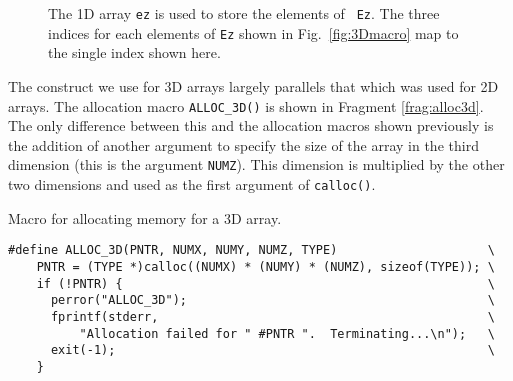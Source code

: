 \begin{figure}
  \begin{center}
   \end{center}
  \caption{The 1D array {\tt ez} is used to store the elements of {\tt
  Ez}.  The three indices for each elements of {\tt Ez} shown in Fig.\
  \ref{fig:3Dmacro} map to the single index shown here.}
  \label{fig:3Darray}
\end{figure}

The construct we use for 3D arrays largely parallels that which was
used for 2D arrays.  The allocation macro {\tt ALLOC\_3D()} is shown
in Fragment \ref{frag:alloc3d}.  The only difference between this and
the allocation macros shown previously is the addition of another
argument to specify the size of the array in the third dimension (this
is the argument {\tt NUMZ}).  This dimension is multiplied by the other
two dimensions and used as the first argument of {\tt calloc()}.

\begin{fragment}
Macro for allocating memory for a 3D array.
\label{frag:alloc3d}
\codemiddle
\begin{lstlisting}
#define ALLOC_3D(PNTR, NUMX, NUMY, NUMZ, TYPE)                     \
    PNTR = (TYPE *)calloc((NUMX) * (NUMY) * (NUMZ), sizeof(TYPE)); \
    if (!PNTR) {                                                   \
      perror("ALLOC_3D");                                          \
      fprintf(stderr,                                              \
          "Allocation failed for " #PNTR ".  Terminating...\n");   \
      exit(-1);                                                    \
    }
\end{lstlisting}
\end{fragment}

